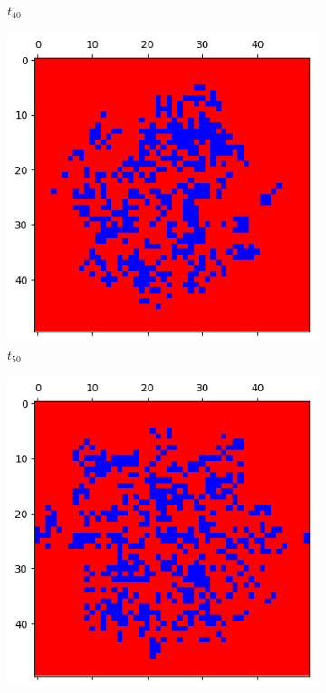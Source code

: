 \documentclass[letterpaper]{article}
\begin{document}
\begin{figure}[H]
\begin{subfigure}{.33\textwidth}
      \caption{$t_{40}$}
    \end{subfigure}
    \begin{subfigure}{.33\textwidth}
      \centering
      \includegraphics[width=1\linewidth]{images/assign2/part32-defect/t50}
      \caption{$t_{50}$}
    \end{subfigure}
    \begin{subfigure}{.33\textwidth}
      \centering
      \includegraphics[width=1\linewidth]{images/assign2/part32-defect/t60}

\end{subfigure}
\end{figure}
\end{document}
